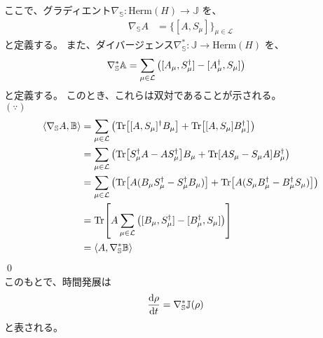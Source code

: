 \documentclass[a4paper,11pt]{jsarticle}
\numberwithin{equation}{section}
\begin{document}
ここで、グラディエント$\nabla_{\mathbb{S}} : \text{Herm}(H) \to \mathbb{J}$
を、
\begin{align}
    \nabla_{\mathbb{S}} A &= \{[A, S_{\mu}]\}_{\mu \in \mathcal{L}}
\end{align}
と定義する。
また、ダイバージェンス$\nabla^*_{\mathbb{S}} : \mathbb{J} \to \text{Herm}(H)$
を、
\begin{align}
    \nabla^*_{\mathbb{S}} \mathbb{A}&=  \sum_{\mu \in \mathcal{L}} \qty([A_{\mu}, S_{\mu}^{\dagger}] - [A_{\mu}^{\dagger}, S_{\mu}])
\end{align}
と定義する。
このとき、これらは双対であることが示される。\\
$(\because)$\\
\begin{align}
    \ev{\nabla_{\mathbb{S}} A , \mathbb{B}} &= \sum_{\mu \in \mathcal{L}} \qty( \Tr[ [A, S_{\mu}]^{\dagger} B_{\mu}] + \Tr[ [A, S_{\mu}] B_{\mu}^{\dagger}]) \\
    &= \sum_{\mu \in \mathcal{L}} \qty( \Tr[ S_{\mu}^{\dagger} A- AS_{\mu}^{\dagger}] B_{\mu} + \Tr[AS_{\mu} - S_{\mu} A] B_{\mu}^{\dagger}) \\
    &= \sum_{\mu \in \mathcal{L}} \qty( \Tr[ A (B_{\mu} S_{\mu}^{\dagger} - S_{\mu}^{\dagger} B_{\mu})] + \Tr[ A (S_{\mu} B_{\mu}^{\dagger} - B_{\mu}^{\dagger} S_{\mu})]) \\
    &= \Tr[ A \sum_{\mu \in \mathcal{L}} \qty( [B_{\mu}, S_{\mu}^{\dagger}] - [B_{\mu}^{\dagger}, S_{\mu}])] \\
    &= \ev{A, \nabla^*_{\mathbb{S}} \mathbb{B}}
\end{align}
\qed\\

このもとで、時間発展は
\begin{align}
    \dv{\rho}{t} &= \nabla^*_{\mathbb{S}} \mathbb{J}(\rho)
\end{align}
と表される。
\end{document}
